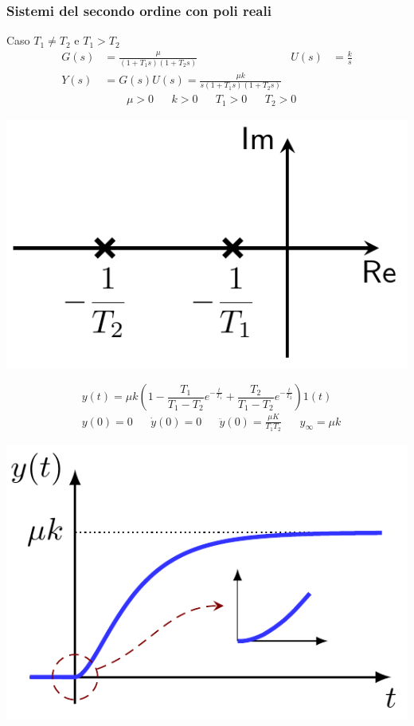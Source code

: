 \documentclass{article}
\numberwithin{equation}{subsection}
\begin{document}
\subsubsection{Sistemi del secondo ordine con poli reali}
Caso $T_1 \neq T_2$ e $T_1 > T_2$
\begin{align*}
    G(s) &= \frac{\mu}{(1+T_1s)(1+T_2s)} & U(s) &= \frac{k}{s}\\
    Y(s) &= G(s)U(s) = \frac{\mu k}{s(1+T_1s)(1+T_2s)} 
\end{align*}
\begin{align*}
    &\mu>0 & &k>0 & &T_1>0 & &T_2>0
\end{align*}
\begin{center}
    \includegraphics[scale=0.23]{Images/Secondo_ordine_poli_reali_1.png}
\end{center}
\[
    y(t) = \mu k \left(1- \frac{T_1}{T_1-T_2}e^{-\frac{t}{T_1}} + \frac{T_2}{T_1-T_2}e^{-\frac{t}{T_2}}\right)1(t)
\]
\begin{align*}
    &y(0) = 0 & &\dot y(0)=0 & &\ddot y(0) = \frac{\mu K}{T_1 T_2} & &y_{\infty}=\mu k
\end{align*}
\begin{center}
    \includegraphics[scale=0.27]{Images/Secondo_ordine_poli_reali_2.png}
\end{center}
\end{document}
